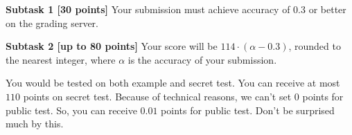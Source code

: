 {\bf Subtask 1 [30 points]}
Your submission must achieve accuracy of $0.3$ or better on the grading server.

{\bf Subtask 2 [up to 80 points]}
Your score will be $114\cdot (\alpha - 0.3)$, rounded to the nearest integer, where $\alpha$ is the accuracy of your submission.

You would be tested on both example and secret test. You can receive at most $110$ points on secret test. Because of technical reasons, we can't set $0$ points for public test. So, you can receive $0.01$ points for public test. Don't be surprised much by this. 